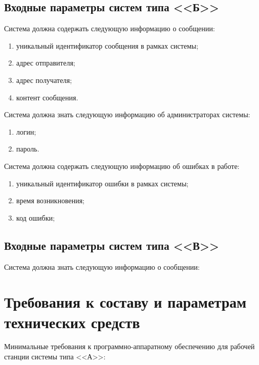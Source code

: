 \subsection{Входные параметры систем типа <<Б>>}

Система должна содержать следующую информацию о сообщении:
\begin{enumerate}
	\item уникальный идентификатор сообщения в рамках системы;
	\item адрес отправителя;
	\item адрес получателя;
	\item контент сообщения.
\end{enumerate}

Система должна знать следующую информацию об администраторах системы:
\begin{enumerate}
	\item логин;
	\item пароль.
\end{enumerate}

Система должна содержать следующую информацию об ошибках в работе:
\begin{enumerate}
	\item уникальный идентификатор ошибки в рамках системы;
	\item время возникновения;
	\item код ошибки;
\end{enumerate}

\subsection{Входные параметры систем типа <<В>>}
Система должна знать следующую информацию о сообщении:



\section{Требования к составу и параметрам технических средств}
Минимальные требования к программно-аппаратному обеспечению для рабочей станции системы типа <<А>>:

